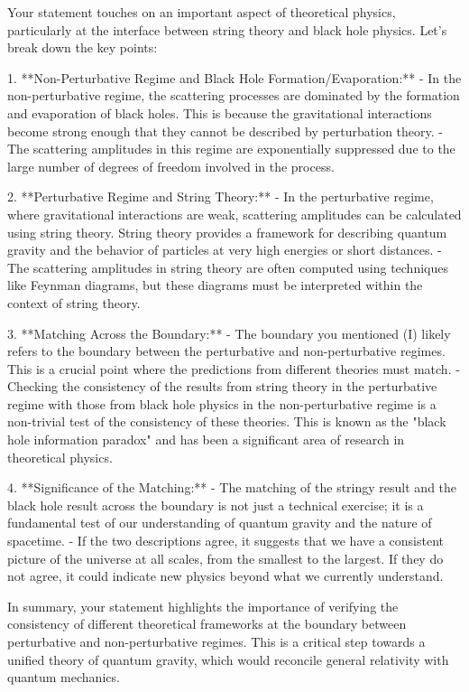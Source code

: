 Your statement touches on an important aspect of theoretical physics, particularly at the interface between string theory and black hole physics. Let's break down the key points:

1. **Non-Perturbative Regime and Black Hole Formation/Evaporation:**
   - In the non-perturbative regime, the scattering processes are dominated by the formation and evaporation of black holes. This is because the gravitational interactions become strong enough that they cannot be described by perturbation theory.
   - The scattering amplitudes in this regime are exponentially suppressed due to the large number of degrees of freedom involved in the process.

2. **Perturbative Regime and String Theory:**
   - In the perturbative regime, where gravitational interactions are weak, scattering amplitudes can be calculated using string theory. String theory provides a framework for describing quantum gravity and the behavior of particles at very high energies or short distances.
   - The scattering amplitudes in string theory are often computed using techniques like Feynman diagrams, but these diagrams must be interpreted within the context of string theory.

3. **Matching Across the Boundary:**
   - The boundary you mentioned (I) likely refers to the boundary between the perturbative and non-perturbative regimes. This is a crucial point where the predictions from different theories must match.
   - Checking the consistency of the results from string theory in the perturbative regime with those from black hole physics in the non-perturbative regime is a non-trivial test of the consistency of these theories. This is known as the "black hole information paradox" and has been a significant area of research in theoretical physics.

4. **Significance of the Matching:**
   - The matching of the stringy result and the black hole result across the boundary is not just a technical exercise; it is a fundamental test of our understanding of quantum gravity and the nature of spacetime.
   - If the two descriptions agree, it suggests that we have a consistent picture of the universe at all scales, from the smallest to the largest. If they do not agree, it could indicate new physics beyond what we currently understand.

In summary, your statement highlights the importance of verifying the consistency of different theoretical frameworks at the boundary between perturbative and non-perturbative regimes. This is a critical step towards a unified theory of quantum gravity, which would reconcile general relativity with quantum mechanics.